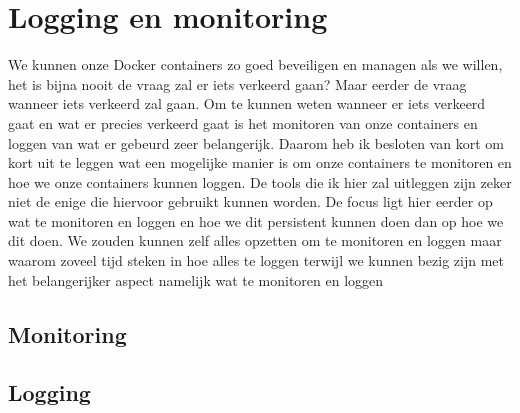 \chapter{Logging en monitoring}

We kunnen onze Docker containers zo goed beveiligen en managen als we willen, het is bijna nooit de vraag zal er iets verkeerd gaan? Maar eerder de vraag wanneer iets verkeerd zal gaan. Om te kunnen weten wanneer er iets verkeerd gaat en wat er precies verkeerd gaat is het monitoren van onze containers en loggen van wat er gebeurd zeer belangerijk. Daarom heb ik besloten van kort om kort uit te leggen wat een mogelijke manier is om onze containers te monitoren en hoe we onze containers kunnen loggen. De tools die ik hier zal uitleggen zijn zeker niet de enige die hiervoor gebruikt kunnen worden. De focus ligt hier eerder op wat te monitoren en loggen en hoe we dit persistent kunnen doen dan op hoe we dit doen. We zouden kunnen zelf alles opzetten om te monitoren en loggen maar waarom zoveel tijd steken in hoe alles te loggen terwijl we kunnen bezig zijn met het belangerijker aspect namelijk wat te monitoren en loggen 

\section{Monitoring}

\section{Logging}